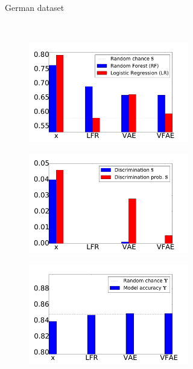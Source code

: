 \begin{figure}[ht]
\begin{subfigure}{\linewidth}
\begin{subfigure}{.329\textwidth}
  \end{subfigure}
  \caption{German dataset}
  \end{subfigure}\\
  \begin{subfigure}{\linewidth}
  \begin{subfigure}{.329\textwidth}
      \centering
      \includegraphics[width=1.1\linewidth]{health_s.pdf}
  \end{subfigure}%
  \begin{subfigure}{.329\textwidth}
      \centering
      \includegraphics[width=1.1\linewidth]{health_discr.pdf}
  \end{subfigure}%
  \begin{subfigure}{.329\textwidth}
      \centering
      \includegraphics[width=1.1\linewidth]{health_y.pdf}

\end{subfigure}
\end{subfigure}
\end{figure}
